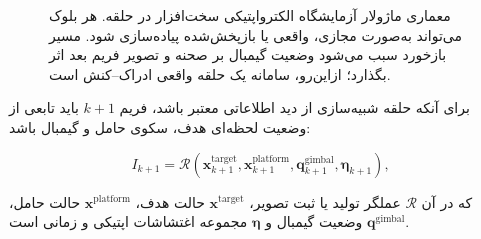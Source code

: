 \documentclass[12pt,a4paper]{article}
\newcommand{\TikzFaText}[2][4cm]{%
	\parbox{#1}{%
		\setRTL
		\centering
		#2%
	}%
}
\begin{document}
\begin{figure}[H]
{%
	}
	
	\caption{
		معماری ماژولار آزمایشگاه الکترواپتیکی سخت‌افزار در حلقه.
		هر بلوک می‌تواند به‌صورت مجازی، واقعی یا بازپخش‌شده پیاده‌سازی
		شود. مسیر بازخورد سبب می‌شود وضعیت گیمبال بر صحنه و تصویر فریم
		بعد اثر بگذارد؛ ازاین‌رو، سامانه یک حلقه واقعی ادراک--کنش است.
	}
	\label{fig:modular_hil_architecture}
\end{figure}

برای آنکه حلقه شبیه‌سازی از دید اطلاعاتی معتبر باشد، فریم
\(k+1\) باید تابعی از وضعیت لحظه‌ای هدف، سکوی حامل و گیمبال باشد:

\begin{equation}
	I_{k+1}
	=
	\mathcal{R}
	\left(
	\mathbf{x}^{\mathrm{target}}_{k+1},
	\mathbf{x}^{\mathrm{platform}}_{k+1},
	\mathbf{q}^{\mathrm{gimbal}}_{k+1},
	\boldsymbol{\eta}_{k+1}
	\right),
	\label{eq:hil_rendering_condition}
\end{equation}

که در آن
\(\mathcal{R}\)
عملگر تولید یا ثبت تصویر،
\(\mathbf{x}^{\mathrm{target}}\)
حالت هدف،
\(\mathbf{x}^{\mathrm{platform}}\)
حالت حامل،
\(\mathbf{q}^{\mathrm{gimbal}}\)
وضعیت گیمبال و
\(\boldsymbol{\eta}\)
مجموعه اغتشاشات اپتیکی و زمانی است.
\end{document}
